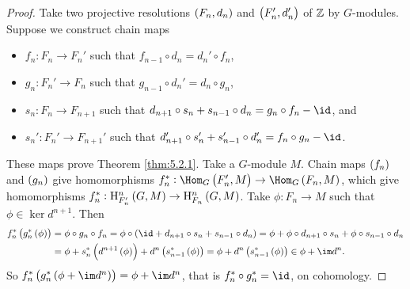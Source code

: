 \begin{proof}
Take two projective resolutions $ \br{F_n, d_n} $ and $ \br{F_n', d_n'} $ of $ \mathbb{Z} $ by $ G $-modules. Suppose we construct chain maps
\begin{itemize}
\item $ f_n : F_n \to F_n' $ such that $ f_{n - 1} \circ d_n = d_n' \circ f_n $,
\item $ g_n : F_n' \to F_n $ such that $ g_{n - 1} \circ d_n' = d_n \circ g_n $,
\item $ s_n : F_n \to F_{n + 1} $ such that $ d_{n + 1} \circ s_n + s_{n - 1} \circ d_n = g_n \circ f_n - \id $, and
\item $ s_n' : F_n' \to F_{n + 1}' $ such that $ d_{n + 1}' \circ s_n' + s_{n - 1}' \circ d_n' = f_n \circ g_n - \id $.
\end{itemize}
These maps prove Theorem \ref{thm:5.2.1}. Take a $ G $-module $ M $. Chain maps $ \br{f_n} $ and $ \br{g_n} $ give homomorphisms $ f_n^* : \Hom_G\br{F_n', M} \to \Hom_G\br{F_n, M} $, which give homomorphisms $ f_n^* : \H_{F_n'}^n\br{G, M} \to \H_{F_n}^n\br{G, M} $. Take $ \phi : F_n \to M $ such that $ \phi \in \ker d^{n + 1} $. Then
\begin{align*}
f_n^*\br{g_n^*\br{\phi}}
& = \phi \circ g_n \circ f_n
= \phi \circ \br{\id + d_{n + 1} \circ s_n + s_{n - 1} \circ d_n}
= \phi + \phi \circ d_{n + 1} \circ s_n + \phi \circ s_{n - 1} \circ d_n \\
& = \phi + s_n^*\br{d^{n + 1}\br{\phi}} + d^n\br{s_{n - 1}^*\br{\phi}}
= \phi + d^n\br{s_{n - 1}^*\br{\phi}}
\in \phi + \im d^n.
\end{align*}
So $ f_n^*\br{g_n^*\br{\phi + \im d^n}} = \phi + \im d^n $, that is $ f_n^* \circ g_n^* = \id $, on cohomology.

\pagebreak


\end{proof}
